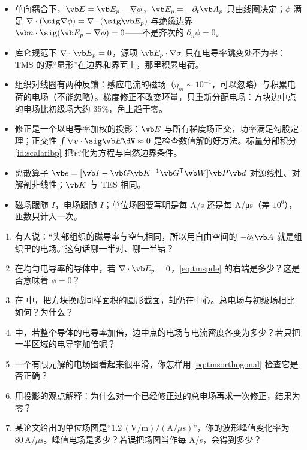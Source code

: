 \begin{takeaways}
\begin{itemize}
\item 单向耦合下，$\vb E=\vb E_p-\nabla\phi$，$\vb E_p=-\partial_t\vb A_p$ 只由线圈决定；$\phi$ 满足 $\nabla\cdot(\sig\nabla\phi)=\nabla\cdot(\sig\vb E_p)$ 与绝缘边界 $\vb n\cdot\sig(\vb E_p-\nabla\phi)=0$——不是齐次的 $\partial_n\phi=0$。
\item 库仑规范下 $\nabla\cdot\vb E_p=0$，源项 $\vb E_p\cdot\nabla\sigma$ 只在电导率跳变处不为零：TMS 的源“显形”在边界和界面上，那里积累电荷。
\item 组织对线圈有两种反馈：感应电流的磁场（$\eta_m\sim10^{-4}$，可以忽略）与积累电荷的电场（不能忽略）。梯度修正不改变环量，只重新分配电场：方块边中点的电场比初级场大约 35\%，角上趋于零。
\item 修正是一个以电导率加权的投影：$\vb E$ 与所有梯度场正交，功率满足勾股定理；正交性 $\int\nabla v\cdot\sig\vb E\dV\approx0$ 是检查数值解的好方法。标量分部积分 \eqref{id:scalaribp} 把它化为方程与自然边界条件。
\item 离散算子 $\vb e=[\vb I-\vb G\vb K^{-1}\vb G^{\mathsf T}\vb W]\vb P\vb d$ 对源线性、对解剖非线性；$\vb K$ 与 TES 相同。
\item 磁场跟随 $I$，电场跟随 $\dot I$；单位场图要写明是每 A/s 还是每 A/μs（差 $10^6$），匝数只计入一次。
\end{itemize}
\end{takeaways}

\begin{selfcheck}
\begin{enumerate}
\item 有人说：“头部组织的磁导率与空气相同，所以用自由空间的 $-\partial_t\vb A$ 就是组织里的电场。”这句话哪一半对、哪一半错？
\item 在均匀电导率的导体中，若 $\nabla\cdot\vb E_p=0$，\eqref{eq:tmspde} 的右端是多少？这是否意味着 $\phi=0$？
\item 在 中，把方块换成同样面积的圆形截面，轴仍在中心。总电场与初级场相比如何？为什么？
\item {} 中，若整个导体的电导率加倍，边中点的电场与电流密度各变为多少？若只把一半区域的电导率加倍呢？
\item 一个有限元解的电场图看起来很平滑，你怎样用 \eqref{eq:tmsorthogonal} 检查它是否正确？
\item 用投影的观点解释：为什么对一个已经修正过的总电场再求一次修正，结果为零？
\item 某论文给出的单位场图是“$1.2\,(\mathrm{V/m})/(\mathrm{A}/\mu\mathrm{s})$”，你的波形峰值变化率为 $80\,\mathrm{A}/\mu\mathrm{s}$。峰值电场是多少？若误把场图当作每 A/s，会得到多少？
\end{enumerate}
\end{selfcheck}

